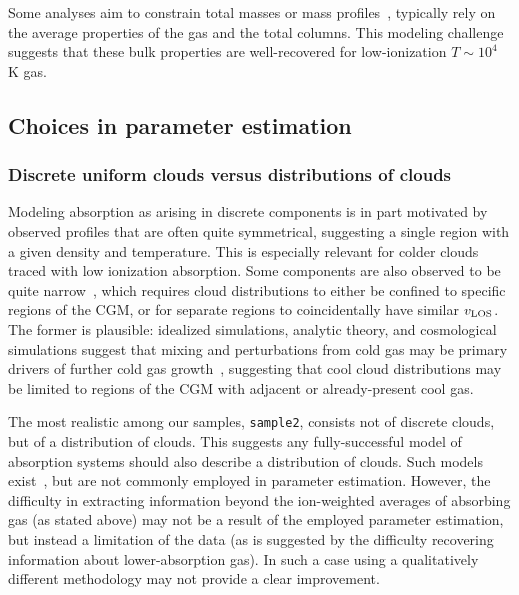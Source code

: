 \documentclass[fleqn,usenatbib]{mnras}
\begin{document}
Some analyses aim to constrain total masses or mass profiles~\citep[e.g.][]{zahedy2019Characterizing}, typically rely on the average properties of the gas and the total columns.
This modeling challenge suggests that these bulk properties are well-recovered for low-ionization $T \sim 10^4$ K gas.

\subsection{Choices in parameter estimation}
\label{s: discussion -- modeling choices}

\subsubsection{Discrete uniform clouds versus distributions of clouds}

Modeling absorption as arising in discrete components is in part motivated by observed profiles that are often quite symmetrical,
suggesting a single region with a given density and temperature. 
This is especially relevant for colder clouds traced with low ionization absorption.
Some components are also observed to be quite narrow~\citep[e.g.][]{churchill1999Population, churchill2001Kinematics}, 
which requires cloud distributions to either be confined to specific regions of the CGM,
or for separate regions to coincidentally have similar $v_{\rm LOS}$.
The former is plausible:
idealized simulations, analytic theory, and cosmological simulations suggest that mixing and perturbations from cold gas may be primary drivers of further cold gas growth~\citep[e.g.][]{nelson2020Resolving, esmerian2021Thermal, gronke2021Survival, gronke2022Cooling, ramesh2022Circumgalactic},
suggesting that cool cloud distributions may be limited to regions of the CGM with adjacent or already-present cool gas.

The most realistic among our samples, \texttt{sample2}, consists not of discrete clouds, but of a distribution of clouds.
This suggests any fully-successful model of absorption systems should also describe a distribution of clouds.
Such models exist~\citep[e.g.][]{stern2016Universal}, but are not commonly employed in parameter estimation.
However, the difficulty in extracting information beyond the ion-weighted averages of absorbing gas (as stated above) may not be a result of the employed parameter estimation,
but instead a limitation of the data (as is suggested by the difficulty recovering information about lower-absorption gas).
In such a case using a qualitatively different methodology may not provide a clear improvement.
\end{document}
